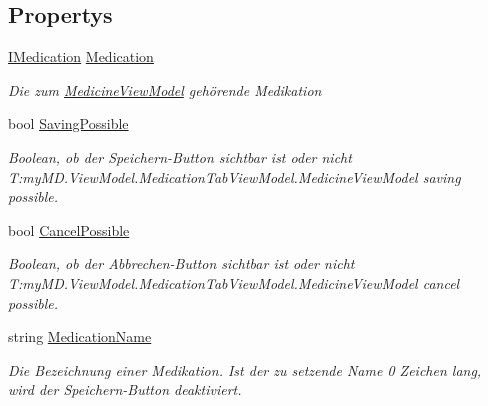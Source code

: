 \subsection*{Propertys}
\begin{DoxyCompactItemize}
\item 
\mbox{\hyperlink{interfacemy_m_d_1_1_model_interface_1_1_data_model_interface_1_1_i_medication}{I\+Medication}} \mbox{\hyperlink{classmy_m_d_1_1_view_model_1_1_medication_tab_view_model_1_1_medicine_view_model_a5705289ccdd374aceb0c0b88bbdcdaef}{Medication}}
\begin{DoxyCompactList}\small\item\em Die zum \mbox{\hyperlink{classmy_m_d_1_1_view_model_1_1_medication_tab_view_model_1_1_medicine_view_model}{Medicine\+View\+Model}} gehörende Medikation \end{DoxyCompactList}\item 
bool \mbox{\hyperlink{classmy_m_d_1_1_view_model_1_1_medication_tab_view_model_1_1_medicine_view_model_a9ada30bb9027a311c3934cef06431310}{Saving\+Possible}}
\begin{DoxyCompactList}\small\item\em Boolean, ob der Speichern-\/\+Button sichtbar ist oder nicht T\+:my\+M\+D.\+View\+Model.\+Medication\+Tab\+View\+Model.\+Medicine\+View\+Model saving possible. \end{DoxyCompactList}\item 
bool \mbox{\hyperlink{classmy_m_d_1_1_view_model_1_1_medication_tab_view_model_1_1_medicine_view_model_ae2bbbd81c983dbab025a3ed6a858c535}{Cancel\+Possible}}
\begin{DoxyCompactList}\small\item\em Boolean, ob der Abbrechen-\/\+Button sichtbar ist oder nicht T\+:my\+M\+D.\+View\+Model.\+Medication\+Tab\+View\+Model.\+Medicine\+View\+Model cancel possible. \end{DoxyCompactList}\item 
string \mbox{\hyperlink{classmy_m_d_1_1_view_model_1_1_medication_tab_view_model_1_1_medicine_view_model_a6d05471333a112926288d1c19073e52a}{Medication\+Name}}
\begin{DoxyCompactList}\small\item\em Die Bezeichnung einer Medikation. Ist der zu setzende Name 0 Zeichen lang, wird der Speichern-\/\+Button deaktiviert. \end{DoxyCompactList}\item 

\end{DoxyCompactItemize}
